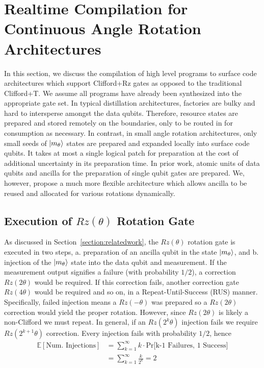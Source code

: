 \section{Realtime Compilation for Continuous Angle Rotation Architectures}
In this section, we discuss the compilation of high level programs to surface code architectures which support Clifford+Rz gates as opposed to the traditional Clifford+T. We assume all programs have already been synthesized into the appropriate gate set. In typical distillation architectures, factories are bulky and hard to intersperse amongst the data qubits. Therefore, resource states are prepared and stored remotely on the boundaries, only to be routed in for consumption as necessary. In contrast, in small angle rotation architectures, only small seeds of $\ket{m_{\theta}}$ states are prepared and expanded locally into surface code qubits. It takes at most a single logical patch for preparation at the cost of additional uncertainty in its preparation time. In prior work, atomic units of data qubits and ancilla for the preparation of single qubit gates are prepared. We, however, propose a much more flexible architecture which allows ancilla to be reused and allocated for various rotations dynamically.

\subsection{Execution of \texorpdfstring{$Rz(\theta)$}{Rz(theta)} Rotation Gate}
As discussed in Section~\ref{section:relatedwork}, the $Rz(\theta)$ rotation gate is executed in two steps, a. preparation of an ancilla qubit in the state $\ket{m_\theta}$, and b. injection of the $\ket{m_\theta}$ state into the data qubit and measurement. If the measurement output signifies a failure (with probability $1/2$), a correction $Rz(2\theta)$ would be required. If this correction fails, another correction gate $Rz(4\theta)$ would be required and so on, in a Repeat-Until-Success (RUS) manner. Specifically, failed injection means a $Rz(-\theta)$ was prepared so a $Rz(2\theta)$ correction would yield the proper rotation. However, since $Rz(2\theta)$ is likely a non-Clifford we must repeat. In general, if an $Rz(2^k\theta)$ injection fails we require $Rz(2^{k+1}\theta)$ correction. Every injection fails with probability $1/2$, hence
\begin{align*}
\mathbb{E}[\text{Num. Injections}] &= \sum_{k=1}^{\infty} k \cdot \text{Pr[k-1 Failures, 1 Success]} \\
&= \sum_{k=1}^{\infty} \frac{k}{2^k} = 2
\end{align*}

